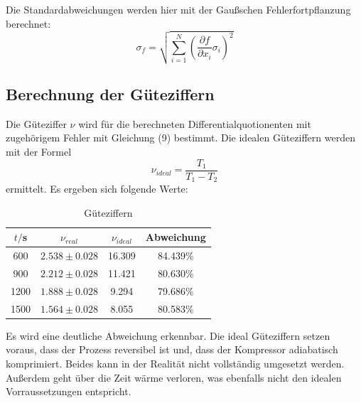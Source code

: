 Die Standardabweichungen werden hier mit der Gaußschen Fehlerfortpflanzung berechnet: \\
\begin{equation}
  \sigma_f = \sqrt{
    \sum\limits_{i = 1}^N
      \left( \frac{\partial f}{\partial x_i} \sigma_i \right)^{\!\! 2}
    }
\end{equation}
\subsection{Berechnung der Güteziffern}
Die Güteziffer $\nu$ wird für die berechneten Differentialquotionenten mit zugehörigem Fehler mit Gleichung (9) bestimmt.
Die idealen Güteziffern werden mit der Formel
\begin{equation}
  \nu_{ideal} = \frac{T_1}{T_1-T_2}
\end{equation}
ermittelt. Es ergeben sich folgende Werte:
\begin{table}
  \centering
  \caption{Güteziffern}
  \label{tab:Reale und ideale Güteziffern}
  \begin{tabular}{c c c c}
    \toprule
    $t/$s & $\nu_{real}$ & $\nu_{ideal}$ & Abweichung \\
    \midrule
     600 & $2.538 \pm 0.028$ &   16.309 &  84.439\% \\
     900 & $2.212 \pm 0.028$ &   11.421 &  80.630\% \\
    1200 & $1.888 \pm 0.028$ &    9.294 &  79.686\% \\
    1500 & $1.564 \pm 0.028$ &    8.055 &  80.583\% \\
    \bottomrule
  \end{tabular}
\end{table}

Es wird eine deutliche Abweichung erkennbar. Die ideal Güteziffern setzen
voraus, dass der Prozess reversibel ist und, dass der Kompressor adiabatisch
komprimiert. Beides kann in der Realität nicht vollständig umgesetzt werden. Außerdem
geht über die Zeit wärme verloren, was ebenfalls nicht den idealen Vorraussetzungen entspricht.
